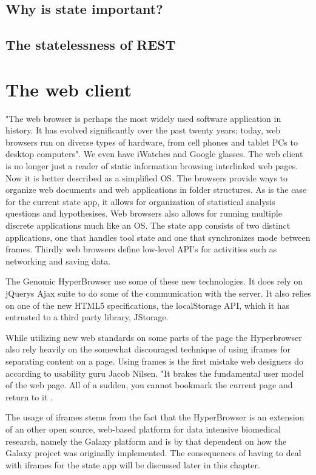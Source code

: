 \documentclass[english]{ifimaster}
\begin{document}
\subsection{Why is state important?}

\subsection{The statelessness of REST}

\section{The web client}
"The web browser is perhaps the most widely used software application in history. It has evolved significantly over the past twenty years; today, web browsers run on diverse types of hardware, from cell phones and tablet PCs to desktop computers"\parencite[p. 2]{gross}. We even have iWatches and Google glasses. The web client is no longer just a reader of static information browsing interlinked web pages. Now it is better described as a simplified OS\parencite[p.310]{flanagan}. The browsers provide ways to organize web documents and web applications in folder structures. As is the case for the current state app, it allows for organization of statistical analysis questions and hypothesises. Web browsers also allows for running multiple discrete applications much like an OS. The state app consists of two distinct applications, one that handles tool state and one that synchronizes mode between frames. Thirdly web browsers define low-level API's for activities such as networking and saving data. 

The Genomic HyperBrowser use some of these new technologies. It does rely on jQuerys Ajax suite to do some of the communication with the server. It also relies on one of the new HTML5 specifications, the localStorage API, which it has entrusted to a third party library, JStorage. 

While utilizing new web standards on some parts of the page the Hyperbrowser also rely heavily on the somewhat discouraged technique of using iframes for separating content on a page. Using frames is the first mistake web designers do according to usability guru Jacob Nilsen. "It brakes the fundamental user model of the web page. All of a sudden, you cannot bookmark the current page and return to it \parencite{nielsen1997user}.

The usage of iframes stems from the fact that the HyperBrowser is an extension of an other open source, web-based platform for data intensive biomedical research, namely the Galaxy platform and is by that dependent on how the Galaxy project was originally implemented. The consequences of having to deal with iframes for the state app will be discussed later in this chapter.
\end{document}
